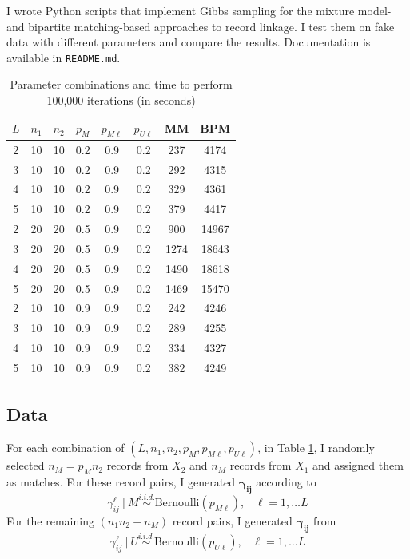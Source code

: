 \documentclass[11pt,reqno]{amsart}
\newcommand\gamij{\mathbf{\gamma_{ij}}}
\begin{document}
I wrote Python scripts that implement Gibbs sampling for the mixture model- and bipartite matching-based approaches to record linkage.  I test them on fake data with different parameters and compare the results.   Documentation is available in \texttt{README.md}. 
\begin{table}[h!]
\caption{Parameter combinations and time to perform 100,000 iterations (in seconds)}
\begin{center}
\begin{tabular}{cccccc|cc}
\toprule
 $L$ &  $n_1$ &  $n_2$ &  $p_M$ &  $p_{M\ell}$ &  $p_{U\ell}$ & MM & BPM \\
\midrule
 2 &  10 &  10 &  0.2 &  0.9 &  0.2 & 237 & 4174 \\
 3 &  10 &  10 &  0.2 &  0.9 &  0.2 & 292 & 4315 \\
 4 &  10 &  10 &  0.2 &  0.9 &  0.2 & 329 & 4361 \\ 
 5 &  10 &  10 &  0.2 &  0.9 &  0.2 & 379 & 4417 \\ 
 2 &  20 &  20 &  0.5 &  0.9 &  0.2 &  900 & 14967 \\ 
 3 &  20 &  20 &  0.5 &  0.9 &  0.2 & 1274 & 18643 \\ 
 4 &  20 &  20 &  0.5 &  0.9 &  0.2 & 1490 & 18618\\
 5 &  20 &  20 &  0.5 &  0.9 &  0.2 & 1469 & 15470 \\
 2 &  10 &  10 &  0.9 &  0.9 &  0.2 &  242 & 4246 \\
 3 &  10 &  10 &  0.9 &  0.9 &  0.2 & 289 & 4255 \\
 4 &  10 &  10 &  0.9 &  0.9 &  0.2 & 334 & 4327 \\
 5 &  10 &  10 &  0.9 &  0.9 &  0.2 & 382 & 4249 \\
\bottomrule
\end{tabular}
\end{center}
\label{params}
\end{table}%

\subsection{Data}

For each combination of $(L, n_1, n_2, p_M, p_{M\ell}, p_{U\ell})$, in Table \ref{params}, I randomly selected $n_M = p_M n_2$ records from $X_2$ and $n_M$ records from $X_1$ and assigned them as matches.  For these record pairs, I generated $\gamij$ according to
 $$\gamma_{ij}^{\ell} \ | \ M \overset{i.i.d.}{\sim}\text{Bernoulli}(p_{M\ell}), \hspace{10pt}\ell = 1,\dots L$$ 
For the remaining $(n_1n_2 - n_M)$ record pairs, I generated $\gamij$ from
  $$\gamma_{ij}^{\ell} \ | \ U \overset{i.i.d.}{\sim}\text{Bernoulli}(p_{U\ell}), \hspace{10pt}\ell = 1,\dots L$$ 
\end{document}
